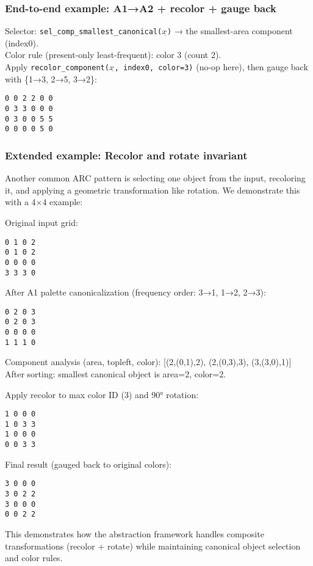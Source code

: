 \documentclass[11pt]{article}
\newcommand{\code}[1]{\texttt{#1}}
\begin{document}
\subsubsection{End-to-end example: A1→A2 + recolor + gauge back}

Selector: \code{sel\_comp\_smallest\_canonical($x_{\hat{}}$)} → the smallest-area component (index0).\\
Color rule (present-only least-frequent): color 3 (count 2).\\
Apply \code{recolor\_component($x_{\hat{}}$, index0, color=3)} (no-op here), then gauge back with \{1→3, 2→5, 3→2\}:
\begin{lstlisting}
0 0 2 2 0 0
0 3 3 0 0 0
0 3 0 0 5 5
0 0 0 0 5 0
\end{lstlisting}

\subsubsection{Extended example: Recolor and rotate invariant}

Another common ARC pattern is selecting one object from the input, recoloring it, and applying a geometric transformation like rotation. We demonstrate this with a 4×4 example:

Original input grid:
\begin{lstlisting}
0 1 0 2
0 1 0 2
0 0 0 0
3 3 3 0
\end{lstlisting}

After A1 palette canonicalization (frequency order: 3→1, 1→2, 2→3):
\begin{lstlisting}
0 2 0 3
0 2 0 3
0 0 0 0
1 1 1 0
\end{lstlisting}

Component analysis (area, topleft, color): [(2,(0,1),2), (2,(0,3),3), (3,(3,0),1)]\\
After sorting: smallest canonical object is area=2, color=2.

Apply recolor to max color ID (3) and 90° rotation:
\begin{lstlisting}
1 0 0 0
1 0 3 3
1 0 0 0
0 0 3 3
\end{lstlisting}

Final result (gauged back to original colors):
\begin{lstlisting}
3 0 0 0
3 0 2 2
3 0 0 0
0 0 2 2
\end{lstlisting}

This demonstrates how the abstraction framework handles composite transformations (recolor + rotate) while maintaining canonical object selection and color rules.
\end{document}

